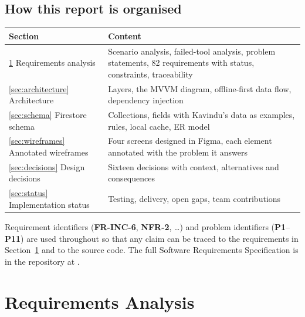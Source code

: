 \documentclass[11pt,a4paper]{article}
\newcommand{\req}[1]{\textsf{\textbf{\color{pfgreendark}#1}}}
\newcommand{\prob}[1]{\textsf{\textbf{\color{pfamberdark}#1}}}
\begin{document}
\subsection{How this report is organised}
\begin{tabularx}{\textwidth}{|l|L|}
\hline
\textbf{Section} & \textbf{Content}\\
\hline
\ref{sec:requirements} Requirements analysis & Scenario analysis, failed-tool analysis, problem statements, 82 requirements with status, constraints, traceability\\
\ref{sec:architecture} Architecture & Layers, the MVVM diagram, offline-first data flow, dependency injection\\
\ref{sec:schema} Firestore schema & Collections, fields with Kavindu's data as examples, rules, local cache, ER model\\
\ref{sec:wireframes} Annotated wireframes & Four screens designed in Figma, each element annotated with the problem it answers\\
\ref{sec:decisions} Design decisions & Sixteen decisions with context, alternatives and consequences\\
\ref{sec:status} Implementation status & Testing, delivery, open gaps, team contributions\\
\hline
\end{tabularx}

Requirement identifiers (\req{FR-INC-6}, \req{NFR-2}, \ldots) and problem identifiers (\prob{P1}--\prob{P11}) are used throughout so that any claim can be traced to the requirements in Section~\ref{sec:requirements} and to the source code. The full Software Requirements Specification is in the repository at .

\section{Requirements Analysis}
\label{sec:requirements}
\end{document}
